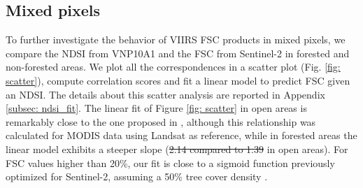 \documentclass[tc, manuscript]{copernicus}
\providecommand{\DIFaddtex}[1]{{\protect\color{blue}\uwave{#1}}} %
\providecommand{\DIFdeltex}[1]{{\protect\color{red}\sout{#1}}}                      %
\providecommand{\DIFaddbegin}{} %
\providecommand{\DIFaddend}{} %
\providecommand{\DIFdelbegin}{} %
\providecommand{\DIFdelend}{} %
\providecommand{\DIFadd}[1]{\texorpdfstring{\DIFaddtex{#1}}{#1}} %
\providecommand{\DIFdel}[1]{\texorpdfstring{\DIFdeltex{#1}}{}} %
\begin{document}
\subsection{Mixed pixels}
\DIFaddbegin \label{subsec: mixed_pixels}
\DIFaddend 

To further investigate the behavior of VIIRS FSC products in mixed pixels, we compare the NDSI from VNP10A1 and the FSC from Sentinel-2 in forested and non-forested areas. We plot all the correspondences in a scatter plot (Fig. \ref{fig: scatter}), compute correlation scores and fit a linear model to predict FSC given an NDSI. The details about this scatter analysis are reported in Appendix \ref{subsec: ndsi_fit}. The linear fit of Figure \ref{fig: scatter} in open areas is remarkably close to the one proposed in \citep{salomonson_development_2006}, although this relationship was calculated for MODIS data using Landsat as reference, while in forested areas the linear model exhibits a steeper slope (\DIFdelbegin \DIFdel{2.14 compared to 1.39 }\DIFdelend \DIFaddbegin \DIFadd{2.17 compared to 1.43 }\DIFaddend in open areas). For FSC values higher than 20\%, our fit is close to a sigmoid function previously optimized for Sentinel-2, assuming a 50\% tree cover density \citep{gascoin_estimating_2020}. 
\end{document}
